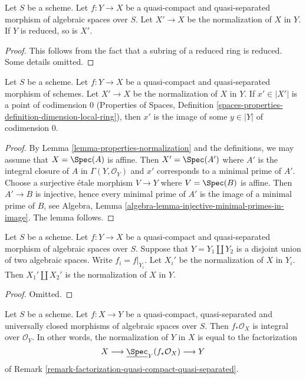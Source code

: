\begin{lemma}
\label{lemma-normalization-in-reduced}
Let $S$ be a scheme. Let $f : Y \to X$ be a quasi-compact and
quasi-separated morphism of algebraic spaces over $S$.
Let $X' \to X$ be the normalization of $X$ in $Y$.
If $Y$ is reduced, so is $X'$.
\end{lemma}

\begin{proof}
This follows from the fact that a subring of a reduced ring is reduced.
Some details omitted.
\end{proof}

\begin{lemma}
\label{lemma-normalization-generic}
Let $S$ be a scheme. Let $f : Y \to X$ be a quasi-compact and quasi-separated
morphism of schemes. Let $X' \to X$ be the normalization of $X$ in $Y$.
If $x' \in |X'|$ is a point of codimension $0$
(Properties of Spaces, Definition
\ref{spaces-properties-definition-dimension-local-ring}), then
$x'$ is the image of some $y \in |Y|$ of codimension $0$.
\end{lemma}

\begin{proof}
By Lemma \ref{lemma-properties-normalization} and the definitions, we may
assume that $X = \Spec(A)$ is affine. Then $X' = \Spec(A')$ where $A'$ is
the integral closure of $A$ in $\Gamma(Y, \mathcal{O}_Y)$ and $x'$ corresponds
to a minimal prime of $A'$. Choose a surjective \'etale
morphism $V \to Y$ where $V = \Spec(B)$ is affine. Then
$A' \to B$ is injective, hence every minimal prime of $A'$ is
the image of a minimal prime of $B$, see
Algebra, Lemma \ref{algebra-lemma-injective-minimal-primes-in-image}.
The lemma follows.
\end{proof}

\begin{lemma}
\label{lemma-normalization-in-disjoint-union}
Let $S$ be a scheme.
Let $f : Y \to X$ be a quasi-compact and quasi-separated morphism of
algebraic spaces over $S$.
Suppose that $Y = Y_1 \amalg Y_2$ is a disjoint union of two
algebraic spaces.
Write $f_i = f|_{Y_i}$. Let $X_i'$ be the normalization of $X$ in $Y_i$.
Then $X_1' \amalg X_2'$ is the normalization of $X$ in $Y$.
\end{lemma}

\begin{proof}
Omitted.
\end{proof}

\begin{lemma}
\label{lemma-normalization-in-universally-closed}
Let $S$ be a scheme.
Let $f : X \to Y$ be a quasi-compact, quasi-separated and
universally closed morphisms of algebraic spaces over $S$.
Then $f_*\mathcal{O}_X$ is integral over $\mathcal{O}_Y$. In other
words, the normalization of $Y$ in $X$ is equal to the factorization
$$
X \longrightarrow \underline{\Spec}_Y(f_*\mathcal{O}_X)
\longrightarrow Y
$$
of Remark \ref{remark-factorization-quasi-compact-quasi-separated}.
\end{lemma}


